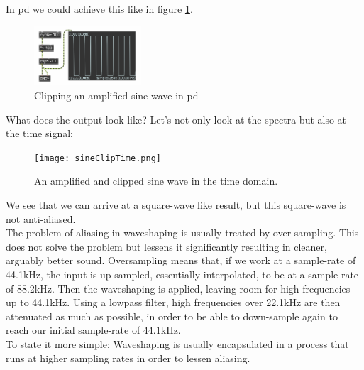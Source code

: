 In pd we could achieve this like in figure \ref{fig:pdClipping}.

\begin{figure}[H]
	\begin{center}
		\includegraphics[width = 4cm]{img/pdSineClipping.png}
		\caption{Clipping an amplified sine wave in pd}
		\label{fig:pdClipping}
	\end{center}
\end{figure}

What does the output look like? Let's not only look at the spectra but also at the time signal:


\begin{figure}[H]
	\begin{center}
		\texttt{[image: sineClipTime.png]}
		\caption{An amplified and clipped sine wave in the time domain.}
		\label{fig:timeClip}
	\end{center}
\end{figure}

We see that we can arrive at a square-wave like result, but this square-wave is not anti-aliased.\\

The problem of aliasing in waveshaping is usually treated by over-sampling. This does not solve the problem but lessens it significantly resulting in cleaner, arguably better sound. Oversampling means that, if we work at a sample-rate of 44.1kHz, the input is up-sampled, essentially interpolated, to be at a sample-rate of 88.2kHz. Then the waveshaping is applied, leaving room for high frequencies up to 44.1kHz. Using a lowpass filter, high frequencies over 22.1kHz are then attenuated as much as possible, in order to be able to down-sample again to reach our initial sample-rate of 44.1kHz. \\
To state it more simple: Waveshaping is usually encapsulated in a process that runs at higher sampling rates in order to lessen aliasing.






